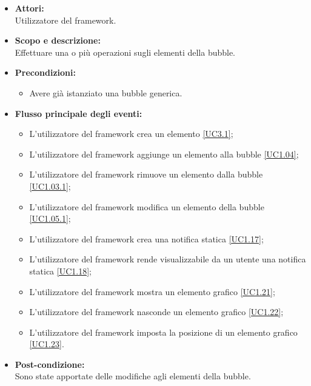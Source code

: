 \begin{itemize}
	\item \textbf{Attori:}
	\\Utilizzatore del framework.
	\item \textbf{Scopo e descrizione:} 
	\\Effettuare una o più operazioni sugli elementi della bubble.
	\item \textbf{Precondizioni:}
	\begin{itemize}
		\item Avere già istanziato una bubble generica.
	\end{itemize}
	\item \textbf{Flusso principale degli eventi:}
	\begin{itemize}
		\item L'utilizzatore del framework crea un elemento \ref{UC3.1};
		\item L'utilizzatore del framework aggiunge un elemento alla bubble \ref{UC1.04};
		\item L'utilizzatore del framework rimuove un elemento dalla bubble \ref{UC1.03.1};
		\item L'utilizzatore del framework modifica un elemento della bubble \ref{UC1.05.1};
		\item L'utilizzatore del framework crea una notifica statica \ref{UC1.17};
		\item L'utilizzatore del framework rende visualizzabile da un utente una notifica statica \ref{UC1.18};
		\item L'utilizzatore del framework mostra un elemento grafico \ref{UC1.21};
		\item L'utilizzatore del framework nasconde un elemento grafico \ref{UC1.22};
		\item L'utilizzatore del framework imposta la posizione di un elemento grafico \ref{UC1.23}.
	\end{itemize}
	\item \textbf{Post-condizione:}
	\\Sono state apportate delle modifiche agli elementi della bubble.
\end{itemize}

